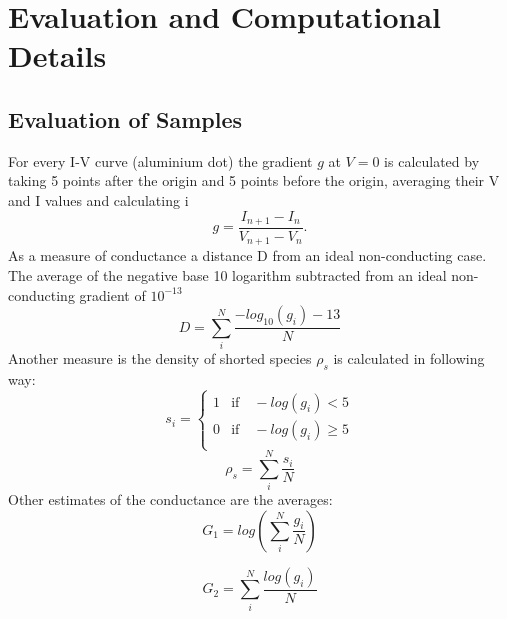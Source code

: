 \documentclass[a4paper]{article}
\begin{document}
\section{Evaluation and Computational Details}
\subsection{Evaluation of Samples}
\label{sec:eval}
For every I-V curve (aluminium dot) the gradient $g$ at $V=0$ is calculated by taking 5 points after the origin and 5 points before the origin, averaging their V and I values and calculating i
\begin{equation}
	g = \frac{I_{n+1} - I_n}{V_{n+1} - V_n}.
\end{equation}
As a measure of conductance a distance D from an ideal non-conducting case. The average of the negative base 10 logarithm subtracted from an ideal non-conducting gradient of $10^{-13}$ 
\begin{equation}
	D = \sum_i^N \frac{ -log_{10}(g_i) - 13}{N}
	\label{eq:D}
\end{equation}
Another measure is the density of shorted species $\rho_{s}$ is calculated in following way:
\begin{equation}
	s_i = \begin{cases}
	1 &\text{if} \quad -log(g_i) < 5 \\
	0 &\text{if} \quad -log(g_i) \geq 5 \\
	\end{cases}
\end{equation}
\begin{equation}
	\rho_s = \sum_i^N \frac{s_i}{N}
	\label{eq:rho}
\end{equation}
Other estimates of the conductance are the averages:
\begin{equation}
	G_1 = log \left( \sum_i^N \frac{g_i}{N} \right)
\end{equation}

\begin{equation}
	G_2 =  \sum_i^N \frac{log(g_i)}{N}
\end{equation}
\end{document}

